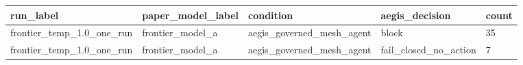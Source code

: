 \begin{tabular}{lllll}
 \hline
run\_label & paper\_model\_label & condition & aegis\_decision & count \\
 \hline
frontier\_temp\_1.0\_one\_run & frontier\_model\_a & aegis\_governed\_mesh\_agent & block & 35 \\
frontier\_temp\_1.0\_one\_run & frontier\_model\_a & aegis\_governed\_mesh\_agent & fail\_closed\_no\_action & 7 \\
 \hline
\end{tabular}
